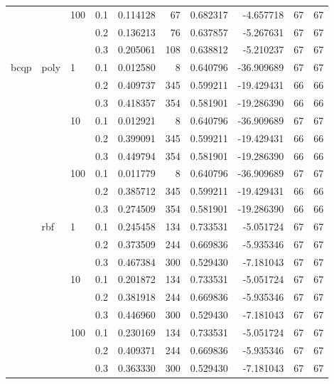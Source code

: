 \begin{table}[H]
\begin{tabular}{llllrrrrrr}
     &     & 100 & 0.1 &  0.114128 &      67 &  0.682317 &  -4.657718 &          67 &        67 \\
     &     &     & 0.2 &  0.136213 &      76 &  0.637857 &  -5.267631 &          67 &        67 \\
     &     &     & 0.3 &  0.205061 &     108 &  0.638812 &  -5.210237 &          67 &        67 \\
bcqp & poly & 1   & 0.1 &  0.012580 &       8 &  0.640796 & -36.909689 &          67 &        67 \\
     &     &     & 0.2 &  0.409737 &     345 &  0.599211 & -19.429431 &          66 &        66 \\
     &     &     & 0.3 &  0.418357 &     354 &  0.581901 & -19.286390 &          66 &        66 \\
     &     & 10  & 0.1 &  0.012921 &       8 &  0.640796 & -36.909689 &          67 &        67 \\
     &     &     & 0.2 &  0.399091 &     345 &  0.599211 & -19.429431 &          66 &        66 \\
     &     &     & 0.3 &  0.449794 &     354 &  0.581901 & -19.286390 &          66 &        66 \\
     &     & 100 & 0.1 &  0.011779 &       8 &  0.640796 & -36.909689 &          67 &        67 \\
     &     &     & 0.2 &  0.385712 &     345 &  0.599211 & -19.429431 &          66 &        66 \\
     &     &     & 0.3 &  0.274509 &     354 &  0.581901 & -19.286390 &          66 &        66 \\
     & rbf & 1   & 0.1 &  0.245458 &     134 &  0.733531 &  -5.051724 &          67 &        67 \\
     &     &     & 0.2 &  0.373509 &     244 &  0.669836 &  -5.935346 &          67 &        67 \\
     &     &     & 0.3 &  0.467384 &     300 &  0.529430 &  -7.181043 &          67 &        67 \\
     &     & 10  & 0.1 &  0.201872 &     134 &  0.733531 &  -5.051724 &          67 &        67 \\
     &     &     & 0.2 &  0.381918 &     244 &  0.669836 &  -5.935346 &          67 &        67 \\
     &     &     & 0.3 &  0.446960 &     300 &  0.529430 &  -7.181043 &          67 &        67 \\
     &     & 100 & 0.1 &  0.230169 &     134 &  0.733531 &  -5.051724 &          67 &        67 \\
     &     &     & 0.2 &  0.409371 &     244 &  0.669836 &  -5.935346 &          67 &        67 \\
     &     &     & 0.3 &  0.363330 &     300 &  0.529430 &  -7.181043 &          67 &        67 \\
\bottomrule
\end{tabular}
\end{table}
